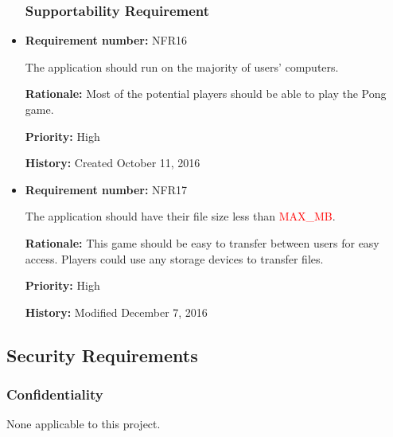 \documentclass[12pt,letterpaper]{article}
\begin{document}
\begin{reqbox}
	\begin{itemize}

\subsubsection{Supportability Requirement}

	\item \textbf{Requirement number: }NFR16
	
	 The application should run on the majority of users’ computers.

	\textbf{Rationale: }Most of the potential players should be able to play the Pong game. 
	
	\textbf{Priority: }High    

	\textbf{History: }Created October 11, 2016    

	\end{itemize}
\end{reqbox}

\begin{reqbox}
	\begin{itemize}

\subsubsection{Portability Requirement}
	\item \textbf{Requirement number: }NFR17

	The application should have their file size less than \textcolor{red}{MAX_MB}.

	\textbf{Rationale: }This game should be easy to transfer between users for easy access. Players could use any storage devices to transfer files.

	\textbf{Priority: }High

	\textbf{History: }Modified December 7, 2016
	\end{itemize}
\end{reqbox}

\subsection{Security Requirements}

\begin{reqbox}
	\begin{itemize}
\subsubsection{Confidentiality}
None applicable to this project.
	\end{itemize}
\end{reqbox}
\end{document}
